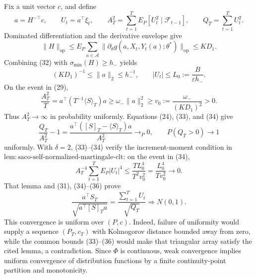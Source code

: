 Fix a unit vector \(c\), and define
\[
 a=H^{-\top}c,\qquad U_t=a^\top\xi_t,\qquad
 A_T^2=\sum_{t=1}^TE_P[U_t^2\mid\mathcal F_{t-1}],\qquad
 Q_T=\sum_{t=1}^TU_t^2.
\tag{31}
\]
Dominated differentiation and the derivative envelope give
\[
 \|H\|_{\mathrm{op}}
 \le E_P\sum_{a\in\mathcal A}\|\partial_\theta g(a,X_t,Y_t(a);\theta^*)\|_{\mathrm{op}}
 \le KD_1.
\tag{32}
\]
Combining (32) with \(\sigma_{\min}(H)\ge h_-\) yields
\[
 (KD_1)^{-1}\le\|a\|_2\le h_-^{-1},
 \qquad |U_t|\le L_0:=\frac{B}{\varepsilon h_-}.
\tag{33}
\]
On the event in (29),
\[
 \frac{A_T^2}{T}
 =a^\top(T^{-1}\langle S\rangle_T)a
 \ge\omega_-\|a\|_2^2
 \ge v_0:=\frac{\omega_-}{(KD_1)^2}>0.
\tag{34}
\]
Thus \(A_T^2\to\infty\) in probability uniformly. Equations (24), (33), and (34) give
\[
 \frac{Q_T}{A_T^2}-1
 =\frac{a^\top([S]_T-\langle S\rangle_T)a}{A_T^2}
 \longrightarrow_P0,
 \qquad P(Q_T>0)\longrightarrow1
\tag{35}
\]
uniformly. With \(\delta=2\), (33)--(34) verify the increment-moment condition in \(\mathrm{lem:saco\text{-}self\text{-}normalized\text{-}martingale\text{-}clt}\): on the event in (34),
\[
 A_T^{-4}\sum_{t=1}^TE_P|U_t|^4
 \le \frac{TL_0^4}{T^2v_0^2}
 =\frac{L_0^4}{Tv_0^2}\longrightarrow0.
\tag{36}
\]
That lemma and (31), (34)--(36) prove
\[
 \frac{a^\top S_T}{\sqrt{a^\top[S]_Ta}}
 =\frac{\sum_{t=1}^TU_t}{\sqrt{Q_T}}
 \Rightarrow N(0,1).
\tag{37}
\]
This convergence is uniform over \((P,c)\). Indeed, failure of uniformity would supply a sequence \((P_T,c_T)\) with Kolmogorov distance bounded away from zero, while the common bounds (33)--(36) would make that triangular array satisfy the cited lemma, a contradiction. Since \(\Phi\) is continuous, weak convergence implies uniform convergence of distribution functions by a finite continuity-point partition and monotonicity.

